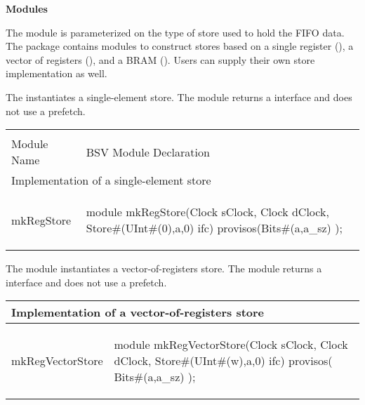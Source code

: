 {\bf Modules}

 The
 module  is  parameterized on the type of store used to hold
the FIFO data.  The  package contains modules to
construct stores based on a single register (), a
vector of registers (), and a BRAM (). 
Users can supply their own store implementation as well.


The  instantiates a  single-element store.  The module returns
a  interface and does not use a prefetch.

\begin{center}
\begin{tabular}{|p{1.4 in}|p{4.1 in}|}
 \hline
  &            \\
Module Name  &  BSV Module Declaration   \\
\hline
\multicolumn{2}{|l|}{Implementation of a single-element store }\\
\hline
\begin{libverbatim}mkRegStore
\end{libverbatim} 
& \begin{libverbatim}
module mkRegStore(Clock sClock, Clock dClock, 
                  Store#(UInt#(0),a,0) ifc)
   provisos(Bits#(a,a_sz) ); \end{libverbatim} 
\\
\hline
\end{tabular}
\end{center}


The  module instantiates a vector-of-registers
store.  The module returns a  interface and does not use a
prefetch.

\begin{center}
\begin{tabular}{|p{1.4 in}|p{4.1 in}|}
 \hline
\multicolumn{2}{|l|}{Implementation of a vector-of-registers store}\\
\hline
\begin{libverbatim}mkRegVectorStore
\end{libverbatim} 
& \begin{libverbatim}
module mkRegVectorStore(Clock sClock, Clock dClock, 
                        Store#(UInt#(w),a,0) ifc)
   provisos( Bits#(a,a_sz) ); \end{libverbatim} 
\\
\hline
\end{tabular}
\end{center}

